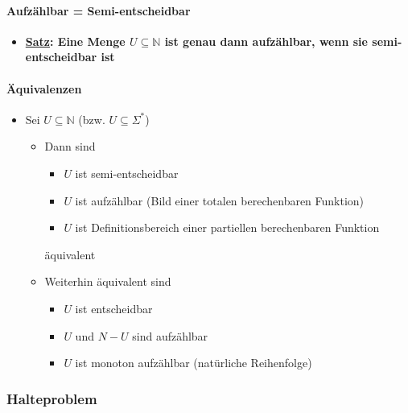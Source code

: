 \documentclass{scrartcl}
\begin{document}
\paragraph{Aufzählbar = Semi-entscheidbar}

\begin{itemize}
	\item \textbf{\underline{Satz}: Eine Menge $U \subseteq \mathbb{N}$ ist genau dann aufzählbar, wenn sie semi-entscheidbar ist}
\end{itemize}

\paragraph{Äquivalenzen}

\begin{itemize}
	\item Sei $U \subseteq \mathbb{N}$ (bzw. $U \subseteq \Sigma^*$)
	\begin{itemize}
		\item Dann sind
		\begin{itemize}
			\item $U$ ist semi-entscheidbar
			\item $U$ ist aufzählbar (Bild einer totalen berechenbaren Funktion)
			\item $U$ ist Definitionsbereich einer partiellen berechenbaren Funktion
		\end{itemize}
		äquivalent
		\item Weiterhin äquivalent sind
		\begin{itemize}
			\item $U$ ist entscheidbar
			\item $U$ und $N-U$ sind aufzählbar
			\item $U$ ist monoton aufzählbar (natürliche Reihenfolge)
		\end{itemize}
	\end{itemize}
\end{itemize}

\subsubsection{Halteproblem}
\end{document}
